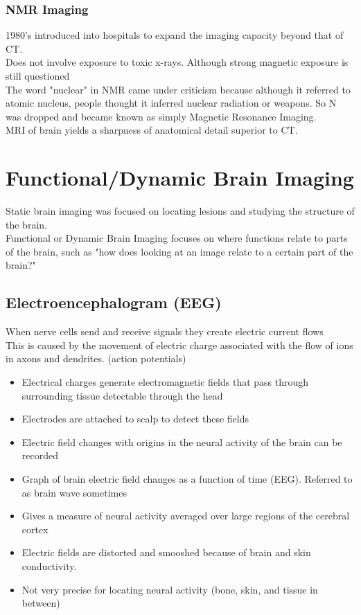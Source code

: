 \documentclass{article}
\begin{document}
\subsubsection{NMR Imaging}
1980's introduced into hospitals to expand the imaging capacity beyond that of CT. \\
Does not involve exposure to toxic x-rays. Although strong magnetic exposure is still questioned \\

The word "nuclear" in NMR came under criticism because although it referred to atomic nucleus, people thought it inferred nuclear radiation or weapons. So N was dropped and became known as simply Magnetic Resonance Imaging. \\

MRI of brain yields a sharpness of anatomical detail superior to CT. 


\section{Functional/Dynamic Brain Imaging}
Static brain imaging was focused on locating lesions and studying the structure of the brain. \\
Functional or Dynamic Brain Imaging focuses on where functions relate to parts of the brain, such as "how does looking at an image relate to a certain part of the brain?" 

\subsection{Electroencephalogram (EEG)}
When nerve cells send and receive signals they create electric current flows  \\
This is caused by the movement of electric charge associated with the flow of ions in axons and dendrites. (action potentials) \\

\begin{itemize}
    \item Electrical charges generate electromagnetic fields that pass through surrounding tissue detectable through the head 
    \item Electrodes are attached to scalp to detect these fields 
    \item Electric field changes with origins in the neural activity of the brain can be recorded 
    \item Graph of brain electric field changes as a function of time (EEG). Referred to as brain wave sometimes
    \item Gives a measure of neural activity averaged over large regions of the cerebral cortex
    \item Electric fields are distorted and smooshed because of brain and skin conductivity. 
    \item Not very precise for locating neural  activity (bone, skin, and tissue in between) 
\end{itemize}
\end{document}
